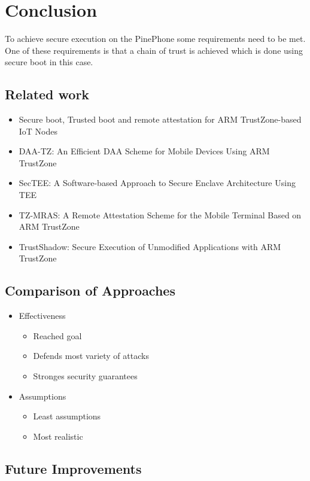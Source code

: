 \documentclass{report}
\begin{document}
\chapter{Conclusion}

To achieve secure execution on the PinePhone some requirements need to be met. One of these requirements is that a chain of trust is achieved which is done using secure boot in this case.

\section{Related work}

\begin{itemize}
\item Secure boot, Trusted boot and remote attestation for ARM TrustZone-based IoT Nodes
\item DAA-TZ: An Efficient DAA Scheme for Mobile Devices Using ARM TrustZone
\item SecTEE: A Software-based Approach to Secure Enclave Architecture Using TEE
\item TZ-MRAS: A Remote Attestation Scheme for the Mobile Terminal Based on ARM TrustZone
\item TrustShadow: Secure Execution of Unmodified Applications with ARM TrustZone
\end{itemize}

\section{Comparison of Approaches}

\begin{itemize}
\item Effectiveness \begin{itemize}
\item Reached goal
\item Defends most variety of attacks
\item Stronges security guarantees
\end{itemize}
\item Assumptions \begin{itemize}
\item Least assumptions
\item Most realistic
\end{itemize}
\end{itemize}

\section{Future Improvements}
\end{document}

